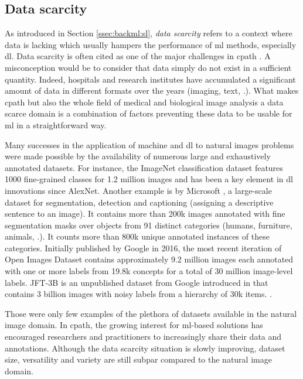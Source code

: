 \subsection{Data scarcity}
\label{ssec:backdp:datascarcity}

As introduced in Section \ref{ssec:backml:sl}, \textit{data scarcity} refers to a context where data is lacking which usually hampers the performance of \acrlong{ml} methods, especially \acrlong{dl}. Data scarcity is often cited as one of the major challenges in \acrlong{cpath} \cite{tizhoosh2018artificial,litjens2017survey,robertson2018digital,komura2018machine}. A misconception would be to consider that data simply do not exist in a sufficient quantity. Indeed, hospitals and research institutes have accumulated a significant amount of data in different formats over the years (imaging, text, \etc.). What makes \acrlong{cpath} but also the whole field of medical and biological image analysis a data scarce domain is a combination of factors preventing these data to be usable for \acrlong{ml} in a straightforward way.

Many successes in the application of machine and \acrlong{dl} to natural images problems were made possible by the availability of numerous large and exhaustively annotated datasets. For instance, the ImageNet classification dataset features 1000 fine-grained classes for 1.2 million images and has been a key element in \acrlong{dl} innovations since AlexNet. Another example is  by Microsoft \cite{lin2014microsoft}, a large-scale dataset for segmentation, detection and captioning (\ie assigning a descriptive sentence to an image). It contains more than 200k images annotated with fine segmentation masks over objects from 91 distinct categories (\ie humans, furniture, animals, \etc.). It counts more than 800k unique annotated instances of these categories. Initially published by Google in 2016, the most recent iteration of Open Images Dataset \cite{kuznetsova2020open} contains approximately 9.2 million images each annotated with one or more labels from 19.8k concepts for a total of 30 million image-level labels. JFT-3B is an unpublished dataset from Google introduced in \cite{zhai2106scaling} that contains 3 billion images with noisy labels from a hierarchy of 30k items. . 

Those were only few examples of the plethora of datasets available in the natural image domain. In \acrlong{cpath}, the growing interest for \acrshort{ml}-based solutions has encouraged researchers and practitioners to increasingly share their data and annotations. Although the data scarcity situation is slowly improving, dataset size, versatility and variety are still subpar compared to the natural image domain.

